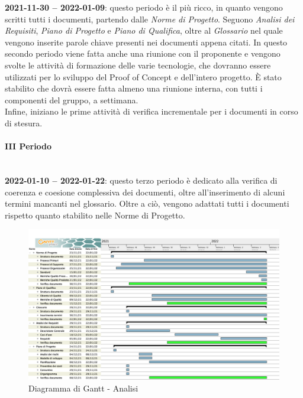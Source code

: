 \textbf{2021-11-30 – 2022-01-09}: questo periodo è il più ricco, in quanto vengono scritti tutti i documenti, partendo dalle \textit{Norme di Progetto}. Seguono \textit{Analisi dei Requisiti}, \textit{Piano di Progetto} e \textit{Piano di Qualifica}, oltre al \textit{Glossario} nel quale vengono inserite parole chiave presenti nei documenti appena citati. In questo secondo periodo viene fatta anche una riunione con il proponente e vengono svolte le attività di formazione delle varie tecnologie, che dovranno essere utilizzati per lo sviluppo del Proof of Concept e dell’intero progetto. È stato stabilito che dovrà essere fatta almeno una riunione interna, con tutti i componenti del gruppo, a settimana. \\
Infine, iniziano le prime attività di verifica incrementale per i documenti in corso di stesura. 

\paragraph{III Periodo} \mbox{} \\

\textbf{2022-01-10 – 2022-01-22}: questo terzo periodo è dedicato alla verifica di coerenza e coesione complessiva dei documenti, oltre all’inserimento di alcuni termini mancanti nel glossario. Oltre a ciò, vengono adattati tutti i documenti rispetto quanto stabilito nelle Norme di Progetto.

\begin{figure}[!h]
\centering
\includegraphics[scale=0.35]{Sezioni/gantt/Analisi.png}
\caption{Diagramma di Gantt - Analisi}
\end{figure}

%